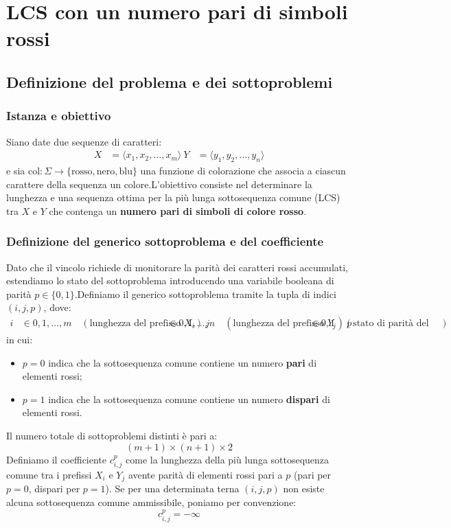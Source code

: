 \chapter{LCS con un numero pari di simboli rossi}\section{Definizione del problema e dei sottoproblemi}\subsection{Istanza e obiettivo}
Siano date due sequenze di caratteri:
\begin{align*}
X &= \langle x_1, x_2, \dots, x_m \rangle \
Y &= \langle y_1, y_2, \dots, y_n \rangle
\end{align*}
e sia $\text{col}: \Sigma \to \{\text{rosso}, \text{nero}, \text{blu}\}$ una funzione di colorazione che associa a ciascun carattere della sequenza un colore.L'obiettivo consiste nel determinare la lunghezza e una sequenza ottima per la più lunga sottosequenza comune (LCS) tra $X$ e $Y$ che contenga un \textbf{numero pari di simboli di colore rosso}.\subsection{Definizione del generico sottoproblema e del coefficiente}
Dato che il vincolo richiede di monitorare la parità dei caratteri rossi accumulati, estendiamo lo stato del sottoproblema introducendo una variabile booleana di parità $p \in \{0, 1\}$.Definiamo il generico sottoproblema tramite la tupla di indici $(i, j, p)$, dove:
\begin{align*}
i &\in {0, 1, \dots, m} \quad (\text{lunghezza del prefisso } X_i) \
j &\in {0, 1, \dots, n} \quad (\text{lunghezza del prefisso } Y_j) \
p &\in {0, 1} \quad (\text{stato di parità del numero di elementi rossi})
\end{align*}
in cui:
\begin{itemize}
\item $p = 0$ indica che la sottosequenza comune contiene un numero \textbf{pari} di elementi rossi;
\item $p = 1$ indica che la sottosequenza comune contiene un numero \textbf{dispari} di elementi rossi.
\end{itemize}Il numero totale di sottoproblemi distinti è pari a:
\begin{equation*}
(m + 1) \times (n + 1) \times 2
\end{equation*}Definiamo il coefficiente $c_{i,j}^p$ come la lunghezza della più lunga sottosequenza comune tra i prefissi $X_i$ e $Y_j$ avente parità di elementi rossi pari a $p$ (pari per $p=0$, dispari per $p=1$). Se per una determinata terna $(i, j, p)$ non esiste alcuna sottosequenza comune ammissibile, poniamo per convenzione:
\begin{equation*}
c_{i,j}^p = -\infty
\end{equation*}

